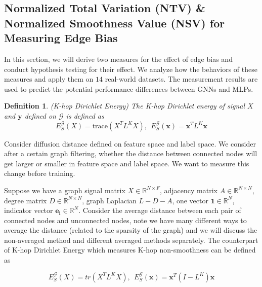 \documentclass{article}
\newcommand{\trace}{\mathrm{trace}}
\newcommand{\0}{{\boldsymbol{0}}}
\newcommand{\6}{{\partial}}
\newcommand{\8}{{\infty}}
\newcommand{\4}{{\nabla}}
\newtheorem{definition}{Definition}
\begin{document}
\subsection{Normalized Total Variation (NTV) \& Normalized Smoothness Value (NSV) for Measuring Edge Bias}

\label{sec:NTV_NSV}
In this section, we will derive two measures for the effect of edge bias and conduct hypothesis testing for their effect. We analyze how the behaviors of these measures and apply them on $14$ real-world datasets. The measurement results are used to predict the potential performance differences between GNNs and MLPs.

\label{sec:measurement}
\begin{definition}(K-hop Dirichlet Energy) The K-hop Dirichlet energy of signal ${X}$ and $\bm{y}$ defined on $\mathcal{G}$ is defined as 
\begin{equation} \label{def:dirichlet_energy}
    E_S^\mathcal{G}({X}) = \trace({X}^T L^K {X}), \ \ E_S^\mathcal{G}(\bm{x}) = \bm{x}^T L^K \bm{x}
\end{equation}
\end{definition}
Consider diffusion distance defined on feature space and label space. We consider after a certain graph filtering, whether the distance between connected nodes will get larger or smaller in feature space and label space. We want to measure this change before training.

Suppose we have a graph signal matrix ${X} \in \mathbb{R}^{N \times F}$, adjacency matrix $A \in \mathbb{R}^{N \times N}$, degree matrix $D \in \mathbb{R}^{N \times N}$, graph Laplacian $L-D-A$, one vector $\bm{1} \in \mathbb{R}^{N}$, indicator vector $\bm{e_i} \in \mathbb{R}^{N}$. Consider the average distance between each pair of connected nodes and unconnected nodes, note we have many different ways to average the distance (related to the sparsity of the graph) and we will discuss the non-averaged method and different averaged methods separately.
The counterpart of K-hop Dirichlet Energy which measures K-hop non-smoothness can be defined as 

\begin{equation} \label{def:dirichlet_energy_counter}
    E_S^\mathcal{G}({X}) = tr\left({X}^T L^K {X}\right), \ \ E_S^\mathcal{G}(\bm{x}) = \bm{x}^T (I-L^K) \bm{x}
\end{equation}
\end{document}
